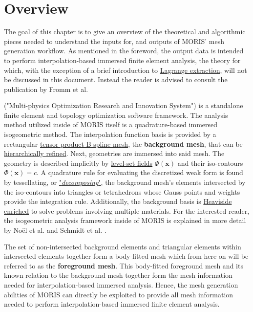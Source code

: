 \chapter{Overview}
\label{sec:overview}

The goal of this chapter is to give an overview of the theoretical and algorithmic pieces needed to understand the inputs for, and outputs of MORIS' mesh generation workflow.
As mentioned in the foreword, the output data is intended to perform interpolation-based immersed finite element analysis, the theory for which, with the exception of a brief introduction to \hyperref[sec:overview_extraction]{Lagrange extraction}, will not be discussed in this document. Instead the reader is advised to consult the publication by Fromm et al. \cite{Fromm2022}

 ("Multi-physics Optimization Research and Innovation System") is a standalone finite element and topology optimization software framework. The analysis method utilized inside of MORIS itself is a quadrature-based immersed isogeometric method. The interpolation function basis is provided by a rectangular \hyperref[sec:overview_background]{tensor-product B-spline mesh}, the \textbf{background mesh}, that can be \hyperlink{hierarchical_refinement}{hierarchically refined}. Next, geometries are immersed into said mesh. The geometry is described implicitly by \hyperref[sec:overview_geometry]{level-set fields} $\Phi(\bm{x})$ and their iso-contours  $\Phi(\bm{x}) = c$. A quadrature rule for evaluating the discretized weak form is found by tessellating, or \hyperlink{decomposition}{"\emph{decomposing}"}, the background mesh's elements intersected by the iso-contours into triangles or tetrahedrons whose Gauss points and weights provide the integration rule. Additionally, the background basis is \hyperlink{enrichment}{Heaviside enriched} to solve problems involving multiple materials. For the interested reader, the isogeometric analysis framework inside of MORIS is explained in more detail by No\"el et al. \cite{Noel2022} and Schmidt et al. \cite{Schmidt2022}.

The set of non-intersected background elements and triangular elements within intersected elements together form a body-fitted mesh which from here on will be referred to as the \textbf{foreground mesh}. This body-fitted foreground mesh and its known relation to the background mesh together form the mesh information needed for interpolation-based immersed analysis. Hence, the mesh generation abilities of MORIS can directly be exploited to provide all mesh information needed to perform interpolation-based immersed finite element analysis.

